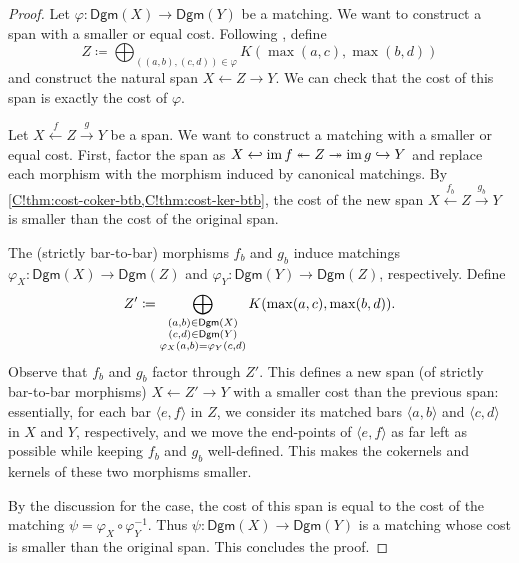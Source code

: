 \begin{proof}
  \noindent\fbox{$\le$}
  Let $\varphi \colon \mathsf{Dgm}(X) \to \mathsf{Dgm}(Y)$ be a matching. We want to construct a span with a smaller or equal cost. Following \cite[Theorem 7.28]{SkrabaTurner2023}, define
  \[
    Z \coloneq \bigoplus_{((a, b), (c, d)) \in \varphi} K(\max(a, c), \max(b, d))
  \]
  and construct the natural span $X \leftarrow Z \rightarrow Y$. We can check that the cost of this span is exactly the cost of $\varphi$.

  \noindent\fbox{$\geq$}
  Let $X \xleftarrow{f} Z \xrightarrow{g} Y$ be a span. We want to construct a matching with a smaller or equal cost. First, factor the span as $X \hookleftarrow \operatorname{im} f \twoheadleftarrow Z \twoheadrightarrow \operatorname{im} g \hookrightarrow Y$ and replace each morphism with the morphism induced by canonical matchings. By \cref{C!thm:cost-coker-btb,C!thm:cost-ker-btb}, the cost of the new span $X \xleftarrow{f_b} Z \xrightarrow{g_b} Y$ is smaller than the cost of the original span.

  The (strictly bar-to-bar) morphisms $f_b$ and $g_b$ induce matchings $\varphi_X \colon \mathsf{Dgm}(X) \to \mathsf{Dgm}(Z)$ and $\varphi_Y \colon  \mathsf{Dgm}(Y) \to \mathsf{Dgm}(Z)$, respectively.
  Define
  \[
    Z' \coloneq \bigoplus_{\substack{(a, b) \in \operatorname{\mathsf{Dgm}}(X) \\ (c, d) \in \operatorname{\mathsf{Dgm}}(Y) \\ \varphi_X(a, b) = \varphi_Y(c, d)}} K(\max(a, c), \max(b, d)).
  \]
  Observe that $f_b$ and $g_b$ factor through $Z'$. This defines a new span (of strictly bar-to-bar morphisms) $X \leftarrow Z' \rightarrow Y$ with a smaller cost than the previous span: essentially, for each bar $\langle e, f\rangle$ in $Z$, we consider its matched bars $\langle a, b \rangle$ and $\langle c, d\rangle$ in $X$ and $Y$, respectively, and we move the end-points of $\langle e, f\rangle$ as far left as possible while keeping $f_b$ and $g_b$ well-defined. This makes the cokernels and kernels of these two morphisms smaller.

  By the discussion for the \fbox{$\leq$} case, the cost of this span is equal to the cost of the matching $\psi = \varphi_X \circ \varphi_Y^{-1}$. Thus $\psi \colon \mathsf{Dgm}(X) \to \mathsf{Dgm}(Y)$ is a matching whose cost is smaller than the original span. This concludes the proof.
\end{proof}

\printbibliography